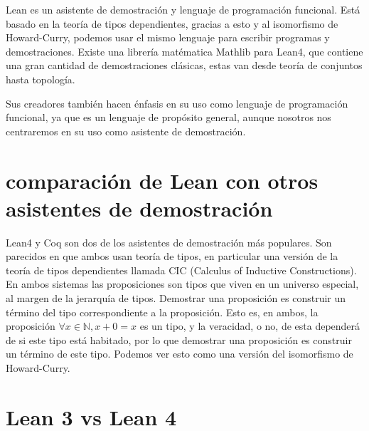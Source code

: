\documentclass[../main.tex]{subfiles}
\begin{document}
Lean es un asistente de demostración y lenguaje de programación funcional.
Está basado en la teoría de tipos dependientes, gracias a esto y al 
isomorfismo de Howard-Curry, podemos usar el mismo lenguaje para escribir
programas y demostraciones. Existe una librería matématica Mathlib para Lean4, que
contiene una gran cantidad de demostraciones clásicas,
estas van desde teoría de conjuntos hasta topología.

Sus creadores también hacen énfasis en su uso como lenguaje de programación
funcional, ya que es un lenguaje de propósito general, aunque nosotros
nos centraremos en su uso como asistente de demostración.

\section{comparación de Lean con otros asistentes de demostración}

Lean4 y Coq son dos de los asistentes de demostración más populares.
Son parecidos en que ambos usan teoría de tipos, en particular una
versión de la teoría de tipos dependientes llamada CIC 
(Calculus of Inductive Constructions). En ambos sistemas las proposiciones
son tipos que viven en un universo especial, al margen de la jerarquía de
tipos. Demostrar una proposición es construir un término del tipo
correspondiente a la proposición. Esto es, en ambos, la proposición
\(\forall x \in \mathbb{N}, x + 0 = x\) es un tipo, y la veracidad,
o no, de esta dependerá de si este tipo está habitado, por lo que demostrar
una proposición es construir un término de este tipo. Podemos ver esto
como una versión del isomorfismo de Howard-Curry.

\section{Lean 3 vs Lean 4}
\end{document}
